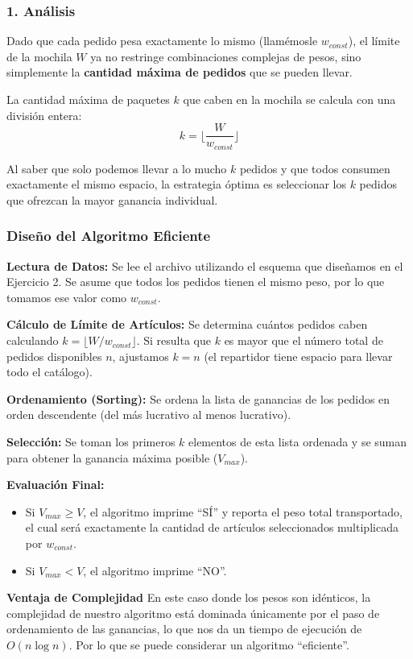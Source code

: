 \subsubsection*{1. Análisis}
Dado que cada pedido pesa exactamente lo mismo (llamémosle $w_{const}$), el límite de la mochila $W$ ya no restringe combinaciones complejas de pesos, sino simplemente la \textbf{cantidad máxima de pedidos} que se pueden llevar.

La cantidad máxima de paquetes $k$ que caben en la mochila se calcula con una división entera:
$$k = \lfloor \frac{W}{w_{const}} \rfloor$$

Al saber que solo podemos llevar a lo mucho $k$ pedidos y que todos consumen exactamente el mismo espacio, la estrategia óptima es seleccionar los $k$ pedidos que ofrezcan la mayor ganancia individual.

\subsubsection*{Diseño del Algoritmo Eficiente}


\textbf{Lectura de Datos:} Se lee el archivo utilizando el esquema que diseñamos en el Ejercicio 2. Se asume que todos los pedidos tienen el mismo peso, por lo que tomamos ese valor como $w_{const}$.

\textbf{Cálculo de Límite de Artículos:} Se determina cuántos pedidos caben calculando $k = \lfloor W / w_{const} \rfloor$. Si resulta que $k$ es mayor que el número total de pedidos disponibles $n$, ajustamos $k = n$ (el repartidor tiene espacio para llevar todo el catálogo).

\textbf{Ordenamiento (Sorting):} Se ordena la lista de ganancias de los pedidos en orden descendente (del más lucrativo al menos lucrativo).

\textbf{Selección:} Se toman los primeros $k$ elementos de esta lista ordenada y se suman para obtener la ganancia máxima posible ($V_{max}$).

\textbf{Evaluación Final:}
\begin{itemize}[leftmargin=*]
    \item Si $V_{max} \ge V$, el algoritmo imprime ``SÍ'' y reporta el peso total transportado, el cual será exactamente la cantidad de artículos seleccionados multiplicada por $w_{const}$.
    \item Si $V_{max} < V$, el algoritmo imprime ``NO''.
\end{itemize}


\textbf{Ventaja de Complejidad}
En este caso donde los pesos son idénticos, la complejidad de nuestro algoritmo está dominada únicamente por el paso de ordenamiento de las ganancias, lo que nos da un tiempo de ejecución de $O(n \log n)$. Por lo que se puede considerar un algoritmo ``eficiente''.

